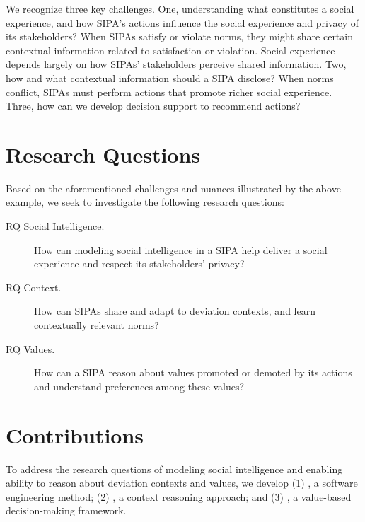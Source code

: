 We recognize three key challenges. One, understanding what constitutes a
social experience, and how SIPA's actions influence the social
experience and privacy of its stakeholders? When SIPAs satisfy or violate
norms, they might share certain contextual information related to
satisfaction or violation. Social experience depends largely on how
SIPAs' stakeholders perceive shared information. Two, how and what
contextual information should a SIPA disclose? When norms conflict,
SIPAs must perform actions that promote richer social experience. Three,
how can we develop decision support to recommend actions?

\section{Research Questions}
\label{sec:intro-questions}

Based on the aforementioned challenges and nuances illustrated by the above example, we seek 
to investigate the following research questions: 

\begin{description}

\item[RQ Social Intelligence.] How can modeling social intelligence in a SIPA help deliver a social experience and respect its stakeholders' privacy?

\item[RQ Context.] How can SIPAs share and adapt to deviation contexts, and learn contextually relevant norms? 

\item[RQ Values.] How can a SIPA reason about values promoted or demoted by its actions and understand preferences among these values?

\end{description}

\section{Contributions}
\label{sec:intro-contributions}

To address the research questions of modeling social intelligence and
enabling ability to reason about deviation contexts and values, we
develop (1) \frameworkA, a software engineering method; (2) \frameworkB, a context
reasoning approach; and (3) \frameworkAinur, a value-based decision-making framework.


